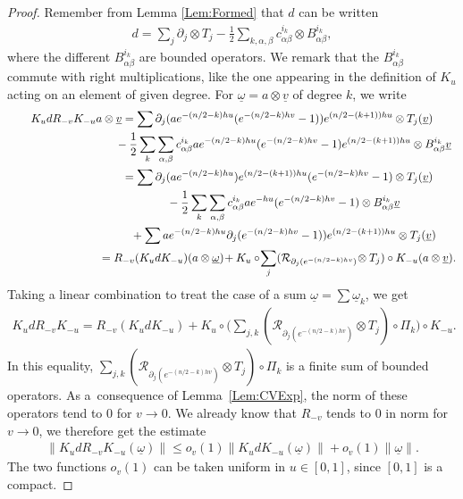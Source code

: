 \documentclass[11pt]{article}
\newcommand{\omegat}{\underline{\omega}}
\newcommand{\RightMult}{\mathcal{R}}
\newcommand{\vt}{\underline{v}}
\numberwithin{equation}{section}
\begin{document}
\begin{proof}
Remember from Lemma \ref{Lem:Formed} that $d$ can be written
\begin{gather*}
d = \sum_j \partial_j \otimes T_j - \frac{1}{2} \sum_{k,\alpha,\beta} c^{i_k}_{\alpha \beta} \otimes B^{i_k}_{\alpha \beta},
\end{gather*}
where the dif\/ferent $B^{i_k}_{\alpha \beta}$ are bounded operators. We remark that the $B^{i_k}_{\alpha \beta}$ commute with right multiplications, like the one appearing in the def\/inition of $K_u$ acting on an element of given degree. For $\omegat = a \otimes \vt$ of degree $k$, we write
\begin{gather*}
K_u d R_{-v} K_{-u} a \otimes \vt = \sum \partial _j(a e^{-(n/2-k)h u}(e^{-(n/2-k) hv} -1) )e^{(n/2-(k+1)) h u} \otimes T_j( \vt ) \\
\hphantom{K_u d R_{-v} K_{-u} a \otimes \vt =}{}
- \frac{1}{2} \sum_{k} \sum_{\alpha, \beta} c^{i_k}_{\alpha \beta} a e^{-(n/2-k)h u}(e^{-(n/2-k) hv} -1) e^{(n/2-(k+1)) h u} \otimes B^{i_k}_{\alpha \beta} \vt \\
\hphantom{K_u d R_{-v} K_{-u} a \otimes \vt }{}
= \sum \partial _j(a e^{-(n/2-k)h u})e^{(n/2-(k+1)) h u} (e^{-(n/2-k) hv} -1) \otimes T_j( \vt ) \\
\hphantom{K_u d R_{-v} K_{-u} a \otimes \vt =}{}
- \frac{1}{2} \sum_{k} \sum_{\alpha, \beta} c^{i_k}_{\alpha \beta} a e^{-h u} (e^{-(n/2-k) hv} -1) \otimes B^{i_k}_{\alpha \beta} \vt \\
\hphantom{K_u d R_{-v} K_{-u} a \otimes \vt =}{}
+ \sum a e^{-(n/2-k)h u}\partial _j(e^{-(n/2-k) hv} -1) )e^{(n/2-(k+1)) h u} \otimes T_j( \vt ) \\
\hphantom{K_u d R_{-v} K_{-u} a \otimes \vt }{}
= R_{-v}(K_u d K_{-u})(a \otimes \omegat) \! + K_{u} \circ\! \sum_{j} (\RightMult_{\partial _j(e^{-(n/2-k) h v})}\! \otimes T_j) \circ K_{-u}(a \otimes \vt).
\end{gather*}
Taking a linear combination to treat the case of a sum $\omegat = \sum \omegat_k$, we get
\begin{gather*}
K_u d R_{-v} K_{-u} = R_{-v}(K_u d K_{-u}) + K_{u} \circ \bigg( \sum_{j,k} (\RightMult_{\partial _j(e^{-(n/2-k) h v})} \otimes T_j) \circ \Pi_k \bigg) \circ K_{-u}.
\end{gather*}
In this equality, $\sum_{j,k} (\RightMult_{\partial _j(e^{-(n/2-k) h v})} \otimes T_j) \circ \Pi_k$ is a f\/inite sum of bounded operators. As a~consequence of Lemma~\ref{Lem:CVExp}, the norm of these operators tend to $0$ for $ v \to 0$. We already know that $R_{-v}$ tends to $0$ in norm for $v \to 0$, we therefore get the estimate
\begin{gather}
\label{Eqn:EstimateKdRK}
\| K_u d R_{-v} K_{-u}( \omegat) \| \leqslant o_v(1) \| K_u d K_{-u}( \omegat) \| + o_v(1) \| \omegat \|.
\end{gather}
The two functions $o_v(1)$ can be taken uniform in $u \in [0,1]$, since $[0,1]$ is a compact.


\end{proof}
\end{document}
